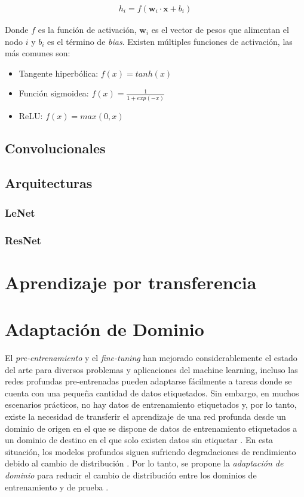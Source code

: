 \begin{align}
    h_i = f(\mathbf{w}_i \cdot \mathbf{x} + b_i)
\end{align}

Donde $f$ es la función de activación, $\mathbf{w}_i$ es el vector de pesos que alimentan el nodo $i$ y $b_i$ es el
término de {\it bias}. Existen múltiples funciones de activación, las más comunes son:

\begin{itemize}
    \item Tangente hiperbólica: $f(x) = tanh(x)$
    \item Función sigmoidea: $f(x) = \frac{1}{1+exp(-x)}$
    \item ReLU: $f(x) = max(0, x)$
\end{itemize}

\subsection{Convolucionales}
\lipsum[1]

\subsection{Arquitecturas}
\lipsum[1]

\subsubsection{LeNet}
\lipsum[1]

\subsubsection{ResNet}
\lipsum[1]

\section{Aprendizaje por transferencia}
\lipsum[1]

\section{Adaptaci\'on de Dominio}
El {\it pre-entrenamiento} y el {\it fine-tuning} han mejorado considerablemente el estado del arte para diversos
problemas y aplicaciones del machine learning, incluso las redes profundas pre-entrenadas pueden adaptarse fácilmente a
tareas donde se cuenta con una pequeña cantidad de datos etiquetados. Sin embargo, en muchos escenarios prácticos, no
hay datos de entrenamiento etiquetados y, por lo tanto, existe la necesidad de transferir el aprendizaje de una red
profunda desde un dominio de origen en el que se dispone de datos de entrenamiento etiquetados a un dominio de destino
en el que solo existen datos sin etiquetar \parencite{glorot2011domain}. En esta situación, los modelos profundos siguen sufriendo degradaciones de rendimiento debido
al cambio de distribución \parencite{quinonero2008dataset}. Por lo tanto, se propone la {\it adaptación de dominio} para reducir el cambio de
distribución entre los dominios de entrenamiento y de prueba \parencite{jiang2022machine}.

